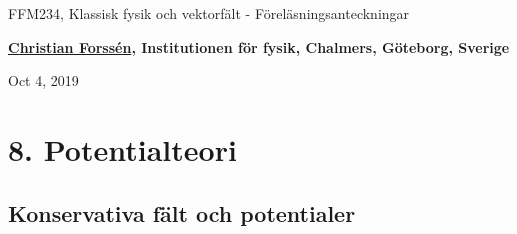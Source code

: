 \documentclass[%
oneside,                 %
final,                   %
10pt]{article}
\begin{document}

\newcommand{\exercisesection}[1]{\subsection*{#1}}







\thispagestyle{empty}

\begin{center}
{\LARGE\bf
\begin{spacing}{1.25}
FFM234, Klassisk fysik och vektorfält - Föreläsningsanteckningar
\end{spacing}
}
\end{center}


\begin{center}
{\bf \href{{http://fy.chalmers.se/subatom/tsp/}}{Christian Forssén}, Institutionen för fysik, Chalmers, Göteborg, Sverige${}^{}$} \\ [0mm]
\end{center}

\begin{center}
\end{center}
    

\begin{center}
Oct 4, 2019
\end{center}

\vspace{1cm}


\section*{8. Potentialteori}

\subsection*{Konservativa fält och potentialer}
\end{document}

